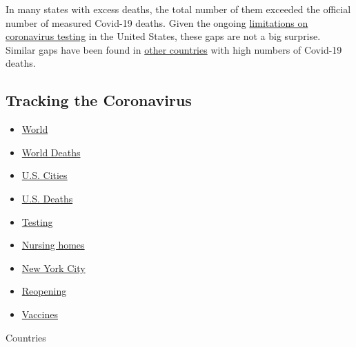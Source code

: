 In many states with excess deaths, the total number of them exceeded the
official number of measured Covid-19 deaths. Given the ongoing
\href{https://www.nytimes3xbfgragh.onion/interactive/2020/04/17/us/coronavirus-testing-states.html}{limitations
on coronavirus testing} in the United States, these gaps are not a big
surprise. Similar gaps have been found in
\href{https://www.nytimes3xbfgragh.onion/interactive/2020/04/21/world/coronavirus-missing-deaths.html}{other
countries} with high numbers of Covid-19 deaths.

\hypertarget{tracking-the-coronavirus}{%
\subsection{Tracking the Coronavirus}\label{tracking-the-coronavirus}}

\begin{itemize}
\tightlist
\item
  \href{https://www.nytimes3xbfgragh.onion/interactive/2020/world/coronavirus-maps.html}{World}
\item
  \href{https://www.nytimes3xbfgragh.onion/interactive/2020/04/21/world/coronavirus-missing-deaths.html}{World
  Deaths}
\item
  \href{https://www.nytimes3xbfgragh.onion/interactive/2020/04/23/upshot/five-ways-to-monitor-coronavirus-outbreak-us.html}{U.S.
  Cities}
\item
  \href{https://www.nytimes3xbfgragh.onion/interactive/2020/05/05/us/coronavirus-death-toll-us.html}{U.S.
  Deaths}
\item
  \href{https://www.nytimes3xbfgragh.onion/interactive/2020/us/coronavirus-testing.html}{Testing}
\item
  \href{https://www.nytimes3xbfgragh.onion/interactive/2020/us/coronavirus-nursing-homes.html}{Nursing
  homes}
\item
  \href{https://www.nytimes3xbfgragh.onion/interactive/2020/nyregion/new-york-city-coronavirus-cases.html}{New
  York City}
\item
  \href{https://www.nytimes3xbfgragh.onion/interactive/2020/us/states-reopen-map-coronavirus.html}{Reopening}
\item
  \href{https://www.nytimes3xbfgragh.onion/interactive/2020/science/coronavirus-vaccine-tracker.html}{Vaccines}
\end{itemize}

Countries

